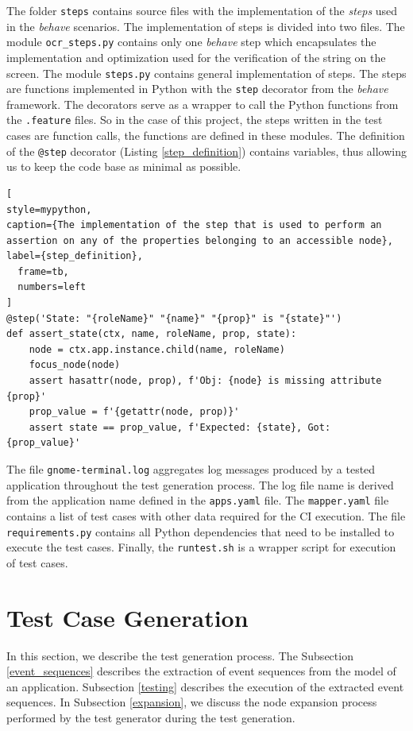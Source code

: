 The folder \texttt{steps} contains source files with the implementation of the \textit{steps} used in the \textit{behave} scenarios. The implementation of steps is divided into two files. The module \texttt{ocr\_steps.py} contains only one \textit{behave} step which encapsulates the implementation and optimization used for the verification of the string on the screen. The module \texttt{steps.py} contains general implementation of steps. The steps are functions implemented in Python with the \texttt{step} decorator from the \textit{behave} framework. The decorators serve as a wrapper to call the Python functions from the \texttt{.feature} files. So in the case of this project, the steps written in the test cases are function calls, the functions are defined in these modules. The definition of the \texttt{@step} decorator (Listing \ref{step_definition}) contains variables, thus allowing us to keep the code base as minimal as possible.

\begin{lstlisting}[
style=mypython,
caption={The implementation of the step that is used to perform an assertion on any of the properties belonging to an accessible node},
label={step_definition},
  frame=tb,
  numbers=left
]
@step('State: "{roleName}" "{name}" "{prop}" is "{state}"')
def assert_state(ctx, name, roleName, prop, state):
    node = ctx.app.instance.child(name, roleName)
    focus_node(node)
    assert hasattr(node, prop), f'Obj: {node} is missing attribute {prop}'
    prop_value = f'{getattr(node, prop)}'
    assert state == prop_value, f'Expected: {state}, Got: {prop_value}'
\end{lstlisting}
The file \texttt{gnome-terminal.log} aggregates log messages produced by a tested application throughout the test generation process. The log file name is derived from the application name defined in the \texttt{apps.yaml} file. The \texttt{mapper.yaml} file contains a list of test cases with other data required for the CI execution. The file \texttt{requirements.py} contains all Python dependencies that need to be installed to execute the test cases. Finally, the \texttt{runtest.sh} is a wrapper script for execution of test cases.

\section{Test Case Generation}\label{generation}

In this section, we describe the test generation process. The Subsection \ref{event_sequences} describes the extraction of event sequences from the model of an application. Subsection \ref{testing} describes the execution of the extracted event sequences. In Subsection \ref{expansion}, we discuss the node expansion process performed by the test generator during the test generation.

